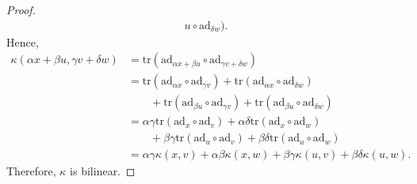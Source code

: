 \documentclass[12pt]{article}
\theoremstyle{definition}
\begin{document}
\begin{enumerate}
\begin{enumerate}[label=(\alph*)]
\begin{proof}
\begin{equation*}
\begin{split}
{                                u}\circ\text{ad}_{\delta w}).
                            \end{split}
                        \end{equation*}
                        Hence, 
                        \begin{equation*}
                            \begin{split}
                                \kappa(\alpha x+\beta u, \gamma v+\delta w) &=
                                \text{tr}(\text{ad}_{\alpha x+\beta
                                u}\circ\text{ad}_{\gamma v+\delta w}) \\
                                &= \text{tr}(\text{ad}_{\alpha
                                x}\circ\text{ad}_{\gamma
                                v})+\text{tr}(\text{ad}_{\alpha
                                x}\circ\text{ad}_{\delta w})\\&\quad\quad
                                +\text{tr}(\text{ad}_{\beta
                                u}\circ\text{ad}_{\gamma
                                v})+\text{tr}(\text{ad}_{\beta
                                u}\circ\text{ad}_{\delta w}) \\
                                &=\alpha\gamma\text{tr}(\text{ad}_x\circ\text{ad}_v)
                                +\alpha\delta\text{tr}(\text{ad}_{x}\circ\text{ad}_w)
                                \\
                                &\quad\quad
                                +\beta\gamma\text{tr}(\text{ad}_u\circ\text{ad}_v)
                                +\beta\delta\text{tr}(\text{ad}_u\circ\text{ad}_w)
                                \\
                                &=\alpha\gamma\kappa(x, v)+\alpha\beta\kappa(x,
                                w)+\beta\gamma\kappa(u,
                                v)+\beta\delta\kappa(u, w).
                            \end{split}
                        \end{equation*}
                        Therefore, $\kappa$ is bilinear.
                    \end{proof}
            \end{enumerate}
    \end{enumerate}
\end{document}
